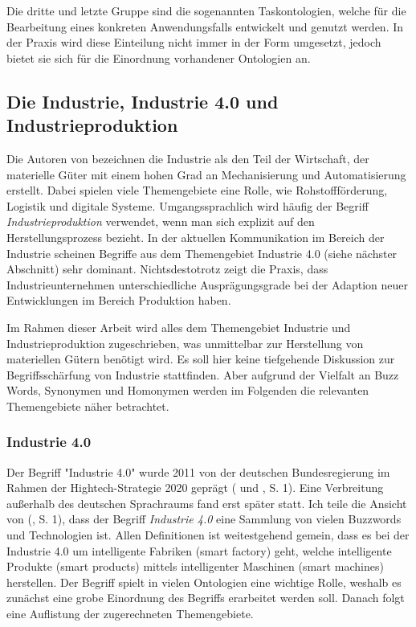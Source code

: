 \documentclass{article}
\begin{document}
Die dritte und letzte Gruppe sind die sogenannten Taskontologien, welche für die Bearbeitung eines konkreten Anwendungsfalls entwickelt und genutzt werden. In der Praxis wird diese Einteilung nicht immer in der Form umgesetzt, jedoch bietet sie sich für die Einordnung vorhandener Ontologien an.

\subsection{Die Industrie, Industrie 4.0 und Industrieproduktion}

Die Autoren von \cite{lasi2014industrie} bezeichnen die Industrie als den Teil der Wirtschaft, der materielle Güter mit einem hohen Grad an Mechanisierung und Automatisierung erstellt. Dabei spielen viele Themengebiete eine Rolle, wie Rohstoffförderung, Logistik und digitale Systeme. Umgangssprachlich wird häufig der Begriff \textit{Industrieproduktion} verwendet, wenn man sich explizit auf den Herstellungsprozess bezieht. In der aktuellen Kommunikation im Bereich der Industrie scheinen Begriffe aus dem Themengebiet Industrie 4.0 (siehe nächster Abschnitt) sehr dominant. Nichtsdestotrotz zeigt die Praxis, dass Industrieunternehmen unterschiedliche Ausprägungsgrade bei der Adaption neuer Entwicklungen im Bereich Produktion haben.

Im Rahmen dieser Arbeit wird alles dem Themengebiet Industrie und Industrieproduktion zugeschrieben, was unmittelbar zur Herstellung von materiellen Gütern benötigt wird. Es soll hier keine tiefgehende Diskussion zur Begriffsschärfung von Industrie stattfinden. Aber aufgrund der Vielfalt an Buzz Words, Synonymen und Homonymen werden im Folgenden die relevanten Themengebiete näher betrachtet.

\subsubsection{Industrie 4.0}

Der Begriff "Industrie 4.0" wurde 2011 von der deutschen Bundesregierung im Rahmen der Hightech-Strategie 2020 geprägt (\cite{lasi2014industrie} und \cite{trotta2018industry}, S. 1). Eine Verbreitung außerhalb des deutschen Sprachraums fand erst später statt. Ich teile die Ansicht von (\cite{ragavan2016engineering}, S. 1), dass der Begriff \textit{Industrie 4.0} eine Sammlung von vielen Buzzwords und Technologien ist. Allen Definitionen ist weitestgehend gemein, dass es bei der Industrie 4.0 um intelligente Fabriken (smart factory) geht, welche intelligente Produkte (smart products) mittels intelligenter Maschinen (smart machines) herstellen. Der Begriff spielt in vielen Ontologien eine wichtige Rolle, weshalb es zunächst eine grobe Einordnung des Begriffs erarbeitet werden soll. Danach folgt eine Auflistung der zugerechneten Themengebiete.
\end{document}
